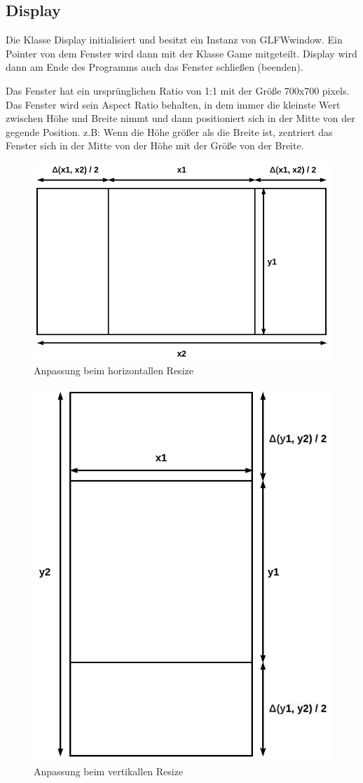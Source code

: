 \documentclass[doktyp=studarbeit]{TUBAFarbeiten}
\begin{document}
\subsection{Display}

Die Klasse Display initialisiert und besitzt ein Instanz von GLFWwindow. 
Ein Pointer von dem Fenster wird dann mit der Klasse Game mitgeteilt. 
Display wird dann am Ende des Programms auch das Fenster schließen (beenden).

Das Fenster hat ein ursprünglichen Ratio von 1:1 mit der Größe 700x700 pixels.
Das Fenster wird sein Aspect Ratio behalten, in dem immer die kleinste Wert 
zwischen Höhe und Breite nimmt und dann positioniert sich in der Mitte von der 
gegende Position. z.B: Wenn die Höhe größer als die Breite ist, zentriert das 
Fenster sich in der Mitte von der Höhe mit der Größe von der Breite. 

\begin{figure}[!htb]
	\centering
	\includegraphics[width=0.6\linewidth]{display-2.png}
	\caption{Anpassung beim horizontallen Resize}
	\label{fig:display-2}
\end{figure}

\begin{figure}[!htb]
	\centering
	\includegraphics[width=0.6\linewidth]{display-3.png}
	\caption{Anpassung beim vertikallen Resize}
	\label{fig:display-3}
\end{figure}
\end{document}

